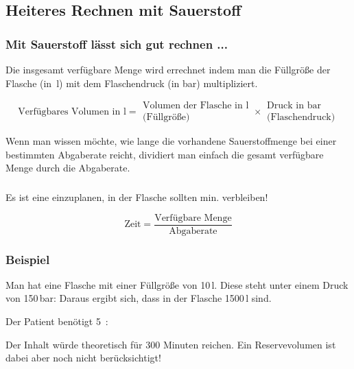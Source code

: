 \documentclass{beamer}
\begin{document}
\subsection{Heiteres Rechnen mit Sauerstoff}
\begin{frame}
\frametitle{Mit Sauerstoff lässt sich gut rechnen ...}



Die insgesamt verfügbare Menge wird errechnet indem man
die Füllgröße der Flasche (in~l) mit dem
Flaschendruck (in bar) multipliziert.

\begin{equation}
\mbox{Verfügbares Volumen in l} = {\begin{array}{c}
\mbox{Volumen der Flasche in l}\\
\mbox{(Füllgröße)} \end{array}}
\times 
\begin{array}{c}{\mbox{Druck in bar}}\\
\mbox{(Flaschendruck)}
\end{array}
\end{equation}

Wenn man wissen möchte, wie lange die vorhandene Sauerstoffmenge bei
einer bestimmten Abgaberate reicht, dividiert man einfach
die gesamt verfügbare Menge durch die Abgaberate. 
\end{frame}

\begin{frame}
\frametitle{}
 Es ist eine 
einzuplanen, in der Flasche sollten min.  verbleiben! 

\begin{equation}
\mbox{Zeit} = \frac{\mbox{Verfügbare
Menge}}{\mbox{Abgaberate}}
\end{equation}
\end{frame}

\begin{frame}
\frametitle{Beispiel}
Man hat eine Flasche mit einer Füllgröße von 10\,l. Diese
steht unter einem Druck von 150\,bar: Daraus ergibt
sich, dass in der Flasche 1500\,l  sind.

Der Patient benötigt 5\,  : 

Der Inhalt würde theoretisch für 300 Minuten reichen. Ein
Reservevolumen ist dabei aber noch nicht berücksichtigt!

\end{frame}
\end{document}
